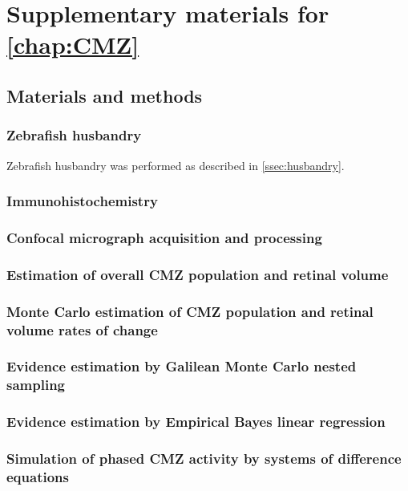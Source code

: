 \chapter{Supplementary materials for \autoref{chap:CMZ}}
\section{Materials and methods}
\subsection{Zebrafish husbandry}
Zebrafish husbandry was performed as described in \autoref{ssec:husbandry}.

\subsection{Immunohistochemistry}

\subsection{Confocal micrograph acquisition and processing}

\subsection{Estimation of overall CMZ population and retinal volume}

\subsection{Monte Carlo estimation of CMZ population and retinal volume rates of change}

\subsection{Evidence estimation by Galilean Monte Carlo nested sampling}

\subsection{Evidence estimation by Empirical Bayes linear regression}

\subsection{Simulation of phased CMZ activity by systems of difference equations}

